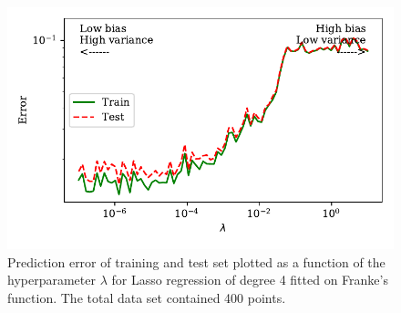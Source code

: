 \documentclass[a4paper, 10pt]{article}
\begin{document}
\begin{figure}[H]
    \includegraphics{figs/biasvariancetradeoff_LASSO_Franke.pdf}
    \caption{Prediction error of training and test set plotted as a function of the hyperparameter $\lambda$ for Lasso regression of degree 4 fitted on Franke's function. The total data set contained 400 points.}
    \label{fig:bias_lasso_Franke}
\end{figure}
\end{document}
